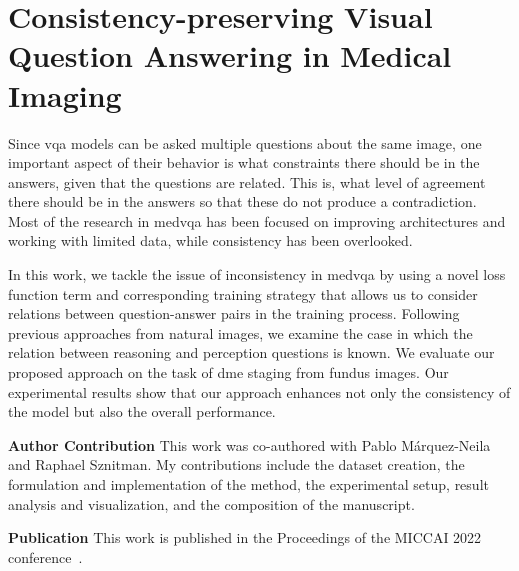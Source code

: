 \chapter{Consistency-preserving Visual Question Answering in Medical Imaging}
\label{chapter:cons_mainsub}

Since \gls{vqa} models can be asked multiple questions about the same image, one important aspect of their behavior is what constraints there should be in the answers, given that the questions are related. This is, what level of agreement there should be in the answers so that these do not produce a contradiction. Most of the research in \gls{medvqa} has been focused on improving architectures and working with limited data, while consistency has been overlooked.  

In this work, we tackle the issue of inconsistency in \gls{medvqa} by using a novel loss function term and corresponding training strategy that allows us to consider relations between question-answer pairs in the training process. Following previous approaches from natural images, we examine the case in which the relation between reasoning and perception questions is known. We evaluate our proposed approach on the task of \gls{dme} staging from fundus images. Our experimental results show that our approach enhances not only the consistency of the model but also the overall performance.


\textbf{Author Contribution} This work was co-authored with Pablo Márquez-Neila and Raphael Sznitman. My contributions include the dataset creation, the formulation and implementation of the method, the experimental setup, result analysis and visualization, and the composition of the manuscript. 

\textbf{Publication} This work is published in the Proceedings of the MICCAI 2022 conference~\cite{tascon2022consistency}.

\newpage




